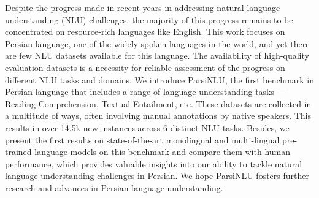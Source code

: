 Despite the progress made in recent years in addressing natural language understanding (NLU) challenges, the majority of this progress remains to be concentrated on resource-rich languages like English. This work focuses on Persian language, one of the widely spoken languages in the world, and yet there are few NLU datasets available for this language. The availability of high-quality evaluation datasets is a necessity for reliable assessment of the progress on different NLU tasks and domains. We introduce ParsiNLU, the first benchmark in Persian language that includes a range of language understanding tasks --- Reading Comprehension, Textual Entailment, etc. These datasets are collected in a multitude of ways, often involving manual annotations by native speakers. This results in over 14.5k new instances across 6 distinct NLU tasks. Besides, we present the first results on state-of-the-art monolingual and multi-lingual pre-trained language models on this benchmark and compare them with human performance, which provides valuable insights into our ability to tackle natural language understanding challenges in Persian. We hope ParsiNLU fosters further research and advances in Persian language understanding.